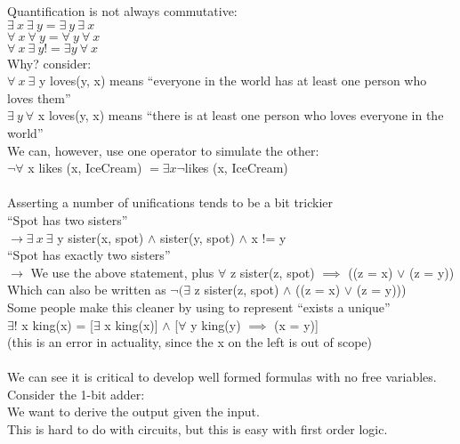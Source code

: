 \documentclass[../../lecture_notes.tex]{subfiles}
\begin{document}
\noindent Quantification is not always commutative:\\
	\indent $\exists \ x \ \exists \ y = \exists \ y \ \exists \ x$\\
	\indent $\forall \ x \ \forall \ y = \forall \ y \ \forall \ x$\\
	\indent $\forall \ x \ \exists \ y != \exists y \ \forall \ x$\\
Why? consider:\\
	\indent $\forall \ x \ \exists$ y loves(y, x) means “everyone in the world has at least one person who loves them”\\
	\indent $ \exists \ y \ \forall$ x loves(y, x) means “there is at least one person who loves everyone in the world”\\
We can, however, use one operator to simulate the other:\\
	\indent $\neg \forall$ x likes (x, IceCream) $= \exists x \neg$likes (x, IceCream)\\
\\
Asserting a number of unifications tends to be a bit trickier\\
	\indent “Spot has two sisters” \\
	\indent \indent $\rightarrow \exists \ x \ \exists$ y sister(x, spot) $\land$ sister(y, spot) $\land$ x != y\\
	\indent “Spot has exactly two sisters” \\
	\indent \indent $\rightarrow$ We use the above statement, 
		plus $\forall$ z sister(z, spot) $\implies$ ((z = x) $\lor$ (z = y))\\
        \indent Which can also be written as $\neg(\exists$ z sister(z, spot) $\land$ ((z = x) $\lor$ (z = y)))\\
Some people make this cleaner by using to represent “exists a unique”\\
\indent $\exists!$ x king(x) = [$\exists$ x king(x)] $\land$ [$\forall$ y king(y) $\implies$ (x = y)]\\
\indent \indent (this is an error in actuality, since the x on the left is out of scope)\\
\\
We can see it is critical to develop well formed formulas with no free variables.\\

\noindent Consider the 1-bit adder:\\
\indent We want to derive the output given the input.\\
\indent This is hard to do with circuits, but this is easy with first order logic.\\
\end{document}
